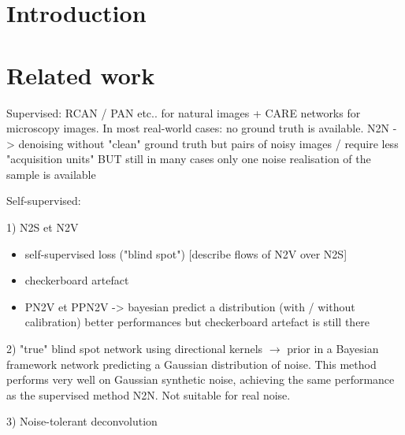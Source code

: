 \documentclass[review]{cvpr}
\begin{document}
\section{Introduction}
\label{sec:introduction}


\section{Related work}
\label{sec:related}


Supervised: RCAN / PAN etc.. for natural images + CARE \cite{weigert2017content} networks for microscopy images. In most real-world cases: no ground truth is available.
N2N \cite{lehtinen2018noise2noise} -> denoising without "clean" ground truth but pairs of noisy images / require less "acquisition units"
BUT still in many cases only one noise realisation of the sample is available

Self-supervised:

1) N2S\cite{batson2019noise2self} et N2V \cite{krull2018noise2void}
\begin{itemize}
\item self-supervised loss ("blind spot") [describe flows of N2V over N2S]
\item checkerboard artefact
\item PN2V\cite{krull2019probabilistic} et PPN2V -> bayesian predict a distribution (with / without calibration) better performances but checkerboard artefact is still there
\end{itemize}

2) \cite{laine2019high} "true" blind spot network using directional kernels $\rightarrow$ prior in a Bayesian framework network predicting a Gaussian distribution of noise. This method performs very well on Gaussian synthetic noise, achieving the same performance as the supervised method N2N. Not suitable for real noise.

3) Noise-tolerant deconvolution \cite{kobayashi2020image}
\end{document}
